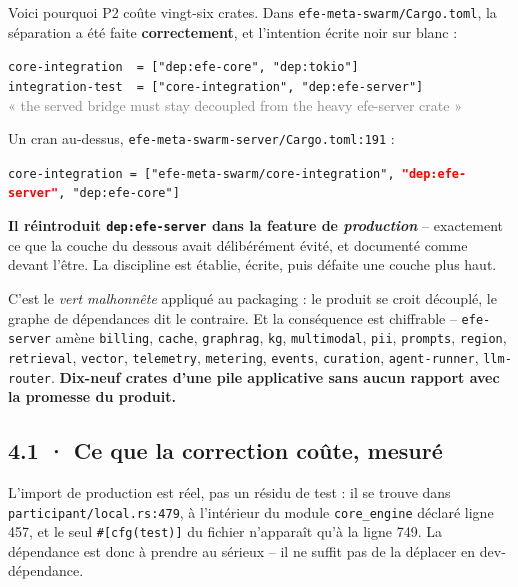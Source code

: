 \documentclass[10pt]{article}
\newcommand{\pire}[1]{\textcolor{red}{\textbf{#1}}}
\newcommand{\sz}[1]{\textcolor{grey}{\small\textsf{#1}}}
\newcommand{\code}[1]{\texttt{\small #1}}
\begin{document}
Voici pourquoi P2 coûte vingt-six crates. Dans \code{efe-meta-swarm/Cargo.toml}, la séparation a été
faite \textbf{correctement}, et l'intention écrite noir sur blanc :

\begin{extrait}
\code{core-integration \ = ["dep:efe-core", "dep:tokio"]} \\
\code{integration-test \ = ["core-integration", "dep:efe-server"]} \\[3pt]
\sz{« the served bridge must stay decoupled from the heavy efe-server crate »}
\end{extrait}

Un cran au-dessus, \code{efe-meta-swarm-server/Cargo.toml:191} :

\begin{extrait}
\code{core-integration = ["efe-meta-swarm/core-integration", \pire{"dep:efe-server"}, "dep:efe-core"]}
\end{extrait}

\begin{alerte}
\textbf{Il réintroduit \code{dep:efe-server} dans la feature de \emph{production}} -- exactement ce que
la couche du dessous avait délibérément évité, et documenté comme devant l'être. La discipline est
établie, écrite, puis défaite une couche plus haut.

C'est le \emph{vert malhonnête} appliqué au packaging : le produit se croit découplé, le graphe de
dépendances dit le contraire. Et la conséquence est chiffrable -- \code{efe-server} amène
\code{billing}, \code{cache}, \code{graphrag}, \code{kg}, \code{multimodal}, \code{pii},
\code{prompts}, \code{region}, \code{retrieval}, \code{vector}, \code{telemetry}, \code{metering},
\code{events}, \code{curation}, \code{agent-runner}, \code{llm-router}. \textbf{Dix-neuf crates d'une
pile applicative sans aucun rapport avec la promesse du produit.}
\end{alerte}

\subsection{4.1 · Ce que la correction coûte, mesuré}

L'import de production est réel, pas un résidu de test : il se trouve dans
\code{participant/local.rs:479}, à l'intérieur du module \code{core\_engine} déclaré ligne 457, et le
seul \code{\#[cfg(test)]} du fichier n'apparaît qu'à la ligne 749. La dépendance est donc à prendre au
sérieux -- il ne suffit pas de la déplacer en dev-dépendance.
\end{document}
